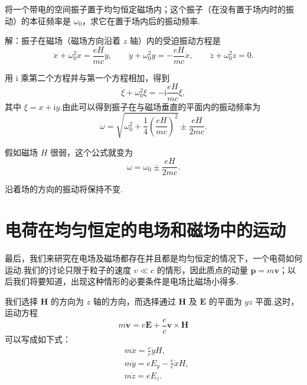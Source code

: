 \begin{xiti}

\quad 将一个带电的空间振子置于均匀恒定磁场内；这个振子（在没有置于场内时的振动）的本征频率是
$\omega_0$，求它在置于场内后的振动频率.

解：振子在磁场（磁场方向沿着 $z$ 轴）内的受迫振动方程是
\begin{equation*}
  \ddot{x}+\omega_0^2x=\frac{eH}{mc}\dot{y},\qquad
  \ddot{y}+\omega_0^2y=-\frac{eH}{mc}\dot{x},\qquad
  \ddot{z}+\omega_0^2z=0.
\end{equation*}

用 $\mathrm{i}$ 乘第二个方程并与第一个方程相加，得到
\begin{equation*}
  \ddot{\xi}+\omega_0^2\xi=-\mathrm{i}\frac{eH}{mc}\dot{\xi},
\end{equation*}
其中 $\xi=x+\mathrm{i}y$.由此可以得到振子在与磁场垂直的平面内的振动频率为
\begin{equation*}
  \omega=\sqrt{\omega_0^2+\frac{1}{4}\left(\frac{eH}{mc}\right)^2}
  \pm\frac{eH}{2mc}.
\end{equation*}

假如磁场 $H$ 很弱，这个公式就变为
\begin{equation*}
  \omega=\omega_0\pm\frac{eH}{2mc}.
\end{equation*}

沿着场的方向的振动将保持不变.

\end{xiti}

\section{电荷在均匀恒定的电场和磁场中的运动}

最后，我们来研究在电场及磁场都存在并且都是均匀恒定的情况下，一个电荷如何运动.我们的讨论只限于粒子的速度
$v\ll c$ 的情形，因此质点的动量 $\boldsymbol{p}=m\boldsymbol{v}$；以后我们将要知道，出现这种情形的必要条件是电场比磁场小得多.

我们选择 $\boldsymbol{H}$ 的方向为 $z$ 轴的方向，而选择通过 $\boldsymbol{H}$ 及 $\boldsymbol{E}$
的平面为 $yz$ 平面.这时，运动方程
\begin{equation*}
  m\dot{\boldsymbol{v}}=e\boldsymbol{E}
  +\frac{e}{c}\boldsymbol{v}\times\boldsymbol{H}
\end{equation*}
可以写成如下式：
\begin{equation}
\begin{aligned}
  &m\ddot{x}=\frac{e}{c}\dot{y}H,\\
  &m\ddot{y}=eE_y-\frac{e}{c}\dot{x}H,\\
  &m\ddot{z}=eE_z.
\end{aligned}
\end{equation}

